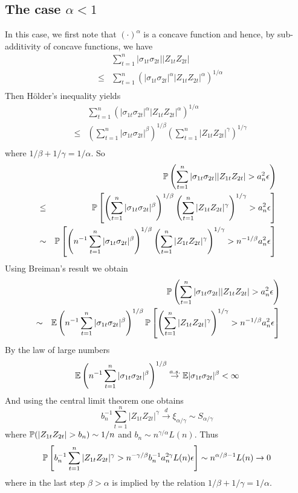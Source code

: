 \documentclass{article}
\begin{document}
\subsection[The case alpha < 1]{The case $\alpha < 1$}
In this case, we first note that $(\cdot)^{\alpha}$ is a concave
function and hence, by sub-additivity of concave functions, we have
\begin{eqnarray*}
&& \sum_{t=1}^n | \sigma_{1t}\sigma_{2t} ||Z_{1t} Z_{2t}| \\
&\leq& \sum_{t=1}^n\left(|\sigma_{1t}\sigma_{2t}|^{\alpha}
  |Z_{1t} Z_{2t}|^{\alpha}\right)^{1/\alpha} \\
\end{eqnarray*}
Then H\"older's inequality yields
\begin{eqnarray*}
&& \sum_{t=1}^n\left(|\sigma_{1t}\sigma_{2t}|^{\alpha}
  |Z_{1t} Z_{2t}|^{\alpha}\right)^{1/\alpha} \\
&\leq& \left(\sum_{t=1}^n|\sigma_{1t}\sigma_{2t}|^{\beta}\right)^{1/\beta}
\left(\sum_{t=1}^n|Z_{1t}Z_{2t}|^{\gamma}\right)^{1/\gamma} \\
\end{eqnarray*}
where $1/\beta + 1/\gamma = 1/\alpha$. So
\begin{eqnarray*}
  && \P\left(\sum_{t=1}^n | \sigma_{1t}\sigma_{2t} ||Z_{1t} Z_{2t}| >
    a_n^2 \epsilon\right) \\
  &\leq& \P\left[
    \left(\sum_{t=1}^n|\sigma_{1t}\sigma_{2t}|^{\beta}\right)^{1/\beta}
    \left(\sum_{t=1}^n|Z_{1t}Z_{2t}|^{\gamma}\right)^{1/\gamma} >
    a_n^2 \epsilon\right] \\
  &\sim& \P\left[
    \left(n^{-1}\sum_{t=1}^n|\sigma_{1t}\sigma_{2t}|^{\beta}\right)^{1/\beta}
    \left(\sum_{t=1}^n|Z_{1t}Z_{2t}|^{\gamma}\right)^{1/\gamma} >
    n^{-1/\beta} a_n^2 \epsilon\right] \\
\end{eqnarray*}
Using Breiman's result we obtain
\begin{eqnarray*}
  && \P\left(\sum_{t=1}^n | \sigma_{1t}\sigma_{2t} ||Z_{1t} Z_{2t}| >
    a_n^2 \epsilon\right) \\
  &\sim&
  \E\left(n^{-1}\sum_{t=1}^n|\sigma_{1t}\sigma_{2t}|^{\beta}\right)^{1/\beta}
  \P\left[
    \left(\sum_{t=1}^n|Z_{1t}Z_{2t}|^{\gamma}\right)^{1/\gamma} >
    n^{-1/\beta} a_n^2 \epsilon\right]  
\end{eqnarray*}
By the law of large numbers
$$
\E\left(n^{-1}\sum_{t=1}^n|\sigma_{1t}\sigma_{2t}|^{\beta}\right)^{1/\beta}
\overset{a.s.}{\to} \E |\sigma_{1t}\sigma_{2t}|^{\beta} < \infty
$$
And using the central limit theorem one obtains
$$
b_n^{-1} \sum_{t=1}^n |Z_{1t}Z_{2t}|^\gamma \overset{d}{\to}
\xi_{\alpha/\gamma} \sim S_{\alpha/\gamma}
$$
where $\P(|Z_{1t} Z_{2t}| > b_n) \sim 1/n$ and $b_n \sim
n^{\gamma/\alpha} L(n)$. Thus
$$
  \P\left[
    b_n^{-1} \sum_{t=1}^n|Z_{1t}Z_{2t}|^{\gamma} >
    n^{-\gamma/\beta} b_n^{-1} a_n^{2\gamma} L(n) \epsilon\right] \sim
  n^{\alpha/\beta - 1} L(n) \to 0
$$
where in the last step $\beta > \alpha$ is implied by the relation
$1/\beta + 1/\gamma = 1/\alpha$.


\end{document}
